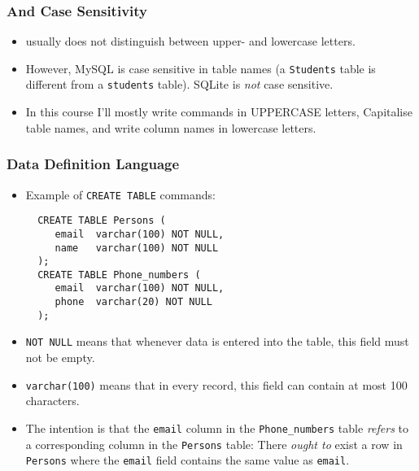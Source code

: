 \documentclass[dvipsnames,handout]{beamer}
\begin{document}
\begin{frame}
  \frametitle{\sql{} And Case Sensitivity}
  
  \begin{itemize}
  \item \sql{} usually does not distinguish between upper- and
    lowercase letters.


  \item However, MySQL is case sensitive in table names (a
    \texttt{Students} table is different from a \texttt{students}
    table). SQLite is \emph{not} case sensitive.


  \item In this course I'll mostly write \sql{} commands in UPPERCASE
    letters, Capitalise table names, and write column names in
    lowercase letters.

  \end{itemize}

\end{frame}


\begin{frame}[fragile=singleslide]
\frametitle{Data Definition Language} 

\begin{itemize}

\item Example of \texttt{CREATE TABLE} commands:
\begin{small}
\begin{verbatim}
  CREATE TABLE Persons (
     email  varchar(100) NOT NULL,
     name   varchar(100) NOT NULL
  );
  CREATE TABLE Phone_numbers (
     email  varchar(100) NOT NULL,
     phone  varchar(20) NOT NULL
  );
\end{verbatim}
\end{small}
\item \texttt{NOT NULL} means that whenever data is entered into the
  table, this field must not be empty.
  
\item \texttt{varchar(100)} means that in every record, this field can
  contain at most 100 characters.

\item The intention is that the \texttt{email} column in the
  \texttt{Phone\_numbers} table \emph{refers} to a corresponding
  column in the \texttt{Persons} table: There \emph{ought to}
  exist a row in \texttt{Persons} where the \texttt{email} field
  contains the same value as \texttt{email}.
\end{itemize}
\end{frame}
\end{document}
